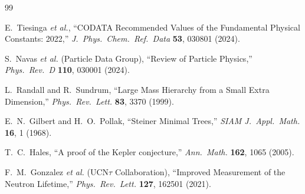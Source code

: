 \documentclass[12pt,a4paper]{article}
\theoremstyle{definition}
\theoremstyle{remark}
\begin{document}
\begin{thebibliography}{99}

  E.~Tiesinga \emph{et al.},
  ``CODATA Recommended Values of the Fundamental Physical Constants: 2022,''
  \emph{J.\ Phys.\ Chem.\ Ref.\ Data} \textbf{53}, 030801 (2024).

  S.~Navas \emph{et al.} (Particle Data Group),
  ``Review of Particle Physics,''
  \emph{Phys.\ Rev.\ D} \textbf{110}, 030001 (2024).

  L.~Randall and R.~Sundrum,
  ``Large Mass Hierarchy from a Small Extra Dimension,''
  \emph{Phys.\ Rev.\ Lett.} \textbf{83}, 3370 (1999).

  E.~N.~Gilbert and H.~O.~Pollak,
  ``Steiner Minimal Trees,''
  \emph{SIAM J.\ Appl.\ Math.} \textbf{16}, 1 (1968).

  T.~C.~Hales,
  ``A proof of the Kepler conjecture,''
  \emph{Ann.\ Math.} \textbf{162}, 1065 (2005).

  F.~M.~Gonzalez \emph{et al.} (UCN$\tau$ Collaboration),
  ``Improved Measurement of the Neutron Lifetime,''
  \emph{Phys.\ Rev.\ Lett.} \textbf{127}, 162501 (2021).

\end{thebibliography}
\end{document}

